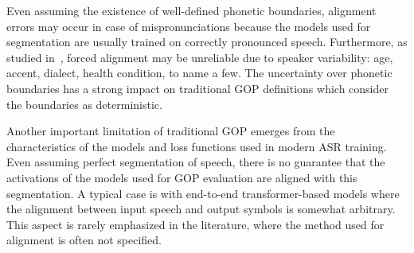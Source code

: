 Even assuming the existence of well-defined phonetic boundaries, alignment errors may occur in case of mispronunciations because the models used for segmentation are usually trained on correctly pronounced speech.
Furthermore, as studied in~\cite{the_impact_of_FA, perform_FA, L2-GOP}, forced alignment may be unreliable due to speaker variability: age, accent, dialect, health condition, to name a few.
The uncertainty over phonetic boundaries has a strong impact on traditional GOP definitions which consider the boundaries as deterministic.
%
%

Another important limitation of traditional GOP emerges from the characteristics of the models and loss functions used in modern ASR training.
Even assuming perfect segmentation of speech, there is no guarantee that the activations of the models used for GOP evaluation are aligned with this segmentation.
A typical case is with end-to-end transformer-based models where the alignment between input speech and output symbols is somewhat arbitrary.
This aspect is rarely emphasized in the literature, where the method used for alignment is often not specified.

